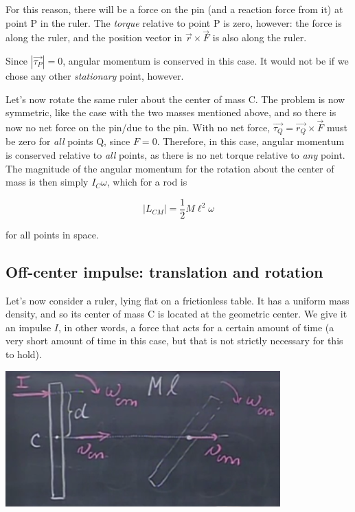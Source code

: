 \documentclass[8.01x]{subfiles}
\begin{document}
For this reason, there will be a force on the pin (and a reaction force from it) at point P in the ruler. The \emph{torque} relative to point P is zero, however: the force is along the ruler, and the position vector in $\vec{r} \times \vec{F}$ is also along the ruler.

Since $|\vec{\tau_P}| = 0$, angular momentum is conserved in this case. It would not be if we chose any other \emph{stationary} point, however.

Let's now rotate the same ruler about the center of mass C. The problem is now symmetric, like the case with the two masses mentioned above, and so there is now no net force on the pin/due to the pin. With no net force, $\vec{\tau_Q} = \vec{r_Q} \times \vec{F}$ must be zero for \emph{all} points Q, since $F = 0$. Therefore, in this case, angular momentum is conserved relative to \emph{all} points, as there is no net torque relative to \emph{any} point. The magnitude of the angular momentum for the rotation about the center of mass is then simply $I_C \omega$, which for a rod is

\begin{equation}
|L_{CM}| = \frac{1}{2} M \ell^2 \omega
\end{equation}

for all points in space.

\subsection{Off-center impulse: translation and rotation}

Let's now consider a ruler, lying flat on a frictionless table. It has a uniform mass density, and so its center of mass C is located at the geometric center. We give it an impulse $I$, in other words, a force that acts for a certain amount of time (a very short amount of time in this case, but that is not strictly necessary for this to hold).

\begin{center}
\includegraphics[scale=0.7]{Graphics/lec21_ruler_rotation}
\end{center}
\end{document}
